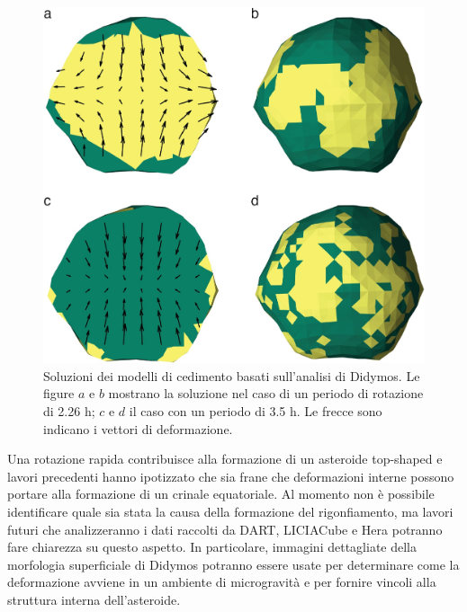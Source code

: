\documentclass[a4paper,11pt,openright]{book}
\begin{document}
\begin{figure}
    \centering
    \includegraphics[scale=0.6]{figure/failure_models.jpg}
    \caption[Soluzioni dei modelli di cedimento basati sull'analisi di Didymos.]{Soluzioni dei modelli di cedimento basati sull'analisi di Didymos. Le figure $a$ e $b$ mostrano la soluzione nel caso di un periodo di rotazione di 2.26 h; $c$ e $d$ il caso con un periodo di 3.5 h. Le frecce sono indicano i vettori di deformazione. \citep{naidu_radar_2020}}
    \label{fig:failure_models}
\end{figure}

Una rotazione rapida contribuisce alla formazione di un asteroide top-shaped e lavori precedenti \citep{walsh_rotational_2008, walsh_spin-up_2012} hanno ipotizzato che sia frane che deformazioni interne possono portare alla formazione di un crinale equatoriale. Al momento non è possibile identificare quale sia stata la causa della formazione del rigonfiamento, ma lavori futuri che analizzeranno i dati raccolti da DART, LICIACube e Hera potranno fare chiarezza su questo aspetto. In particolare, immagini dettagliate della morfologia superficiale di Didymos potranno essere usate per determinare come la deformazione avviene in un ambiente di microgravità e per fornire vincoli alla struttura interna dell'asteroide.
\end{document}
